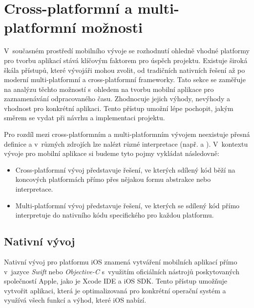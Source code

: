 \section{Cross-platformní a multi-platformní možnosti}\label{crossplatform-multiplatform}

V~současném prostředí mobilního vývoje se rozhodnutí ohledně vhodné platformy pro tvorbu aplikací stává klíčovým faktorem pro úspěch projektu. Existuje široká škála přístupů, které vývojáři mohou zvolit, od tradičních nativních řešení až po moderní multi-platformní a cross-platformní frameworky. Tato sekce se zaměřuje na analýzu těchto možností s~ohledem na tvorbu mobilní aplikace pro zaznamenávání odpracovaného času. Zhodnocuje jejich výhody, nevýhody a vhodnost pro konkrétní aplikaci. Tento přístup umožní lépe pochopit, jakým směrem se vydat při návrhu a implementaci projektu.

Pro rozdíl mezi cross-platformním a multi-platformním vývojem neexistuje přesná definice a v~různých zdrojích lze nalézt různé interpretace (např. \cite{cross-multiplatform-alternative-intepretation-one} a \cite{cross-multiplatform-alternative-intepretation-two}). V~kontextu vývoje pro mobilní aplikace si budeme tyto pojmy vykládat následovně:
\begin{itemize}
\item Cross-platformní vývoj představuje řešení, ve kterých sdílený kód běží na koncových platformách přímo přes nějakou formu abstrakce nebo interpretace.
\item Multi-platformní vývoj představuje řešení, ve kterých se sdílený kód přímo interpretuje do nativního kódu specifického pro každou platformu.
\end{itemize}

\subsection{Nativní vývoj}

Nativní vývoj pro platformu iOS znamená vytváření mobilních aplikací přímo v~jazyce \emph{Swift} nebo \emph{Objective-C} s~využitím oficiálních nástrojů poskytovaných společností Apple, jako je Xcode IDE a iOS SDK. Tento přístup umožňuje vytvořit aplikaci, která je optimalizovaná pro konkrétní operační systém a využívá všech funkcí a výhod, které iOS nabízí.

